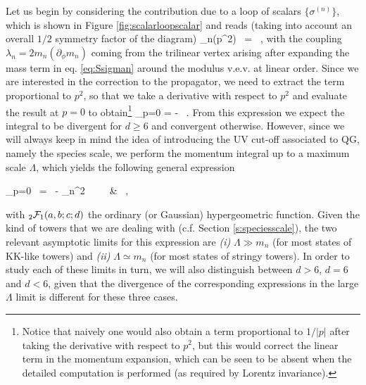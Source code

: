 Let us begin by considering the contribution due to a loop of scalars $\{\sigma^{(n)}\}$, which is shown in Figure \ref{fig:scalarloopscalar} and  reads (taking into account an overall $1/2$ symmetry factor of the diagram)
%
\beq
		\Pi_n(p^2) \ =  \int {}  \, ,
\label{eq:selfenergyscalar(ap)}
\eeq
%
with the coupling $\lambda_n=2m_n(\partial_\phi m_n)$ coming from the trilinear vertex arising after expanding the mass term in eq. \eqref{eq:Ssigman} around the modulus v.e.v. at linear order. Since we are interested in the correction to the propagator, we need to extract the term proportional to $p^2$, so that we take a derivative with respect to $p^2$ and evaluate the result at $p=0$ to obtain\footnote{Notice that naively one would also obtain a term proportional to $1/|p|$ after taking the derivative with respect to $p^2$, but this would correct the linear term in the momentum expansion, which can be seen to be absent when the detailed computation is performed (as required by Lorentz invariance).} 
%
\beq
		 \bigg\rvert_{p=0}  = -  \int {} \, .
\label{eq:sigmaa_ap}
\eeq
%
From this expression we expect the integral to be divergent for $d\geq 6$ and convergent otherwise. However, since we will always keep in mind the idea of introducing the UV cut-off associated to QG, namely the species scale, we perform the momentum integral up to a maximum scale $\Lambda$, which yields the following general expression
%
\beq
		\begin{split}
			 \bigg\rvert_{p=0}  \, =  \, - \lambda_n^2  \  \  \ &   \, ,
		\end{split}
\label{eq:scalarloopscalarexact}
\eeq
%  
with $_2{\cal F}_1(a,b;c;d)$ the ordinary (or Gaussian) hypergeometric function. Given the kind of towers that we are dealing with (c.f. Section \ref{s:speciesscale}), the two relevant asymptotic limits for this expression are \emph{(i)} $\Lambda \gg m_n$ (for most states of KK-like towers) and \emph{(ii)} $\Lambda \simeq m_n$ (for most states of stringy towers). In order to study each of these limits in turn, we will also distinguish between $d>6$, $d=6$ and $d<6$, given that the divergence of the corresponding expressions in the large $\Lambda$ limit is different for these three cases.
		
